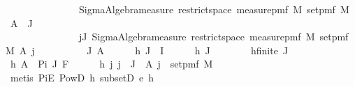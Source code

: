 \begin{isabellebody}
\ \ \ \ \ \ \ \ \ \ \ \ \ \ \ Sigma{\isacharunderscore}{\kern0pt}Algebra{\isachardot}{\kern0pt}measure\ {\isacharparenleft}{\kern0pt}restrict{\isacharunderscore}{\kern0pt}space\ {\isacharparenleft}{\kern0pt}measure{\isacharunderscore}{\kern0pt}pmf\ M{\isacharparenright}{\kern0pt}\ {\isacharparenleft}{\kern0pt}set{\isacharunderscore}{\kern0pt}pmf\ M{\isacharparenright}{\kern0pt}{\isacharparenright}{\kern0pt}\ {\isacharparenleft}{\kern0pt}{\isasymInter}\ {\isacharparenleft}{\kern0pt}A\ {\isacharbackquote}{\kern0pt}\ J{\isacharparenright}{\kern0pt}{\isacharparenright}{\kern0pt}\ {\isacharequal}{\kern0pt}\isanewline
\ \ \ \ \ \ \ \ \ \ \ \ \ \ \ {\isacharparenleft}{\kern0pt}{\isasymProd}j{\isasymin}J{\isachardot}{\kern0pt}\ Sigma{\isacharunderscore}{\kern0pt}Algebra{\isachardot}{\kern0pt}measure\ {\isacharparenleft}{\kern0pt}restrict{\isacharunderscore}{\kern0pt}space\ {\isacharparenleft}{\kern0pt}measure{\isacharunderscore}{\kern0pt}pmf\ M{\isacharparenright}{\kern0pt}\ {\isacharparenleft}{\kern0pt}set{\isacharunderscore}{\kern0pt}pmf\ M{\isacharparenright}{\kern0pt}{\isacharparenright}{\kern0pt}\ {\isacharparenleft}{\kern0pt}A\ j{\isacharparenright}{\kern0pt}{\isacharparenright}{\kern0pt}{\isachardoublequoteclose}\isanewline
\ \ \isamarkupfalse%
\ {\isacharminus}{\kern0pt}\isanewline
\ \ \ \ \isamarkupfalse%
\ J\ A\isanewline
\ \ \ \ \isamarkupfalse%
\ h{}{\isacharcolon}{\kern0pt}\ {\isachardoublequoteopen}J\ {\isasymsubseteq}\ I{\isachardoublequoteclose}\isanewline
\ \ \ \ \isamarkupfalse%
\ h{}{\isacharcolon}{\kern0pt}\ {\isachardoublequoteopen}J\ {\isasymnoteq}\ {\isacharbraceleft}{\kern0pt}{\isacharbraceright}{\kern0pt}{\isachardoublequoteclose}\isanewline
\ \ \ \ \isamarkupfalse%
\ h{}{\isacharcolon}{\kern0pt}{\isachardoublequoteopen}finite\ J{\isachardoublequoteclose}\isanewline
\ \ \ \ \isamarkupfalse%
\ h{}{\isacharcolon}{\kern0pt}\ {\isachardoublequoteopen}A\ {\isasymin}\ Pi\ J\ F{\isachardoublequoteclose}\isanewline
\isanewline
\ \ \ \ \isamarkupfalse%
\ h{}{\isacharcolon}{\kern0pt}\ {\isachardoublequoteopen}{\isasymAnd}j{\isachardot}{\kern0pt}\ j\ {\isasymin}\ J\ {\isasymLongrightarrow}\ A\ j\ {\isasymsubseteq}\ set{\isacharunderscore}{\kern0pt}pmf\ M{\isachardoublequoteclose}\isanewline
\ \ \ \ \ \ \isamarkupfalse%
\ {\isacharparenleft}{\kern0pt}metis\ PiE\ PowD\ h{}\ subsetD\ e\ h{}{\isacharparenright}{\kern0pt}\isanewline

\end{isabellebody}
